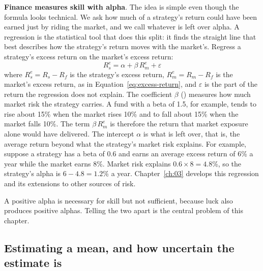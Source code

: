 \textbf{Finance measures skill with alpha}. The idea is simple even though the formula looks technical. We ask how much of a strategy's return could have been earned just by riding the market, and we call whatever is left over alpha. A regression is the statistical tool that does this split: it finds the straight line that best describes how the strategy's return moves with the market's. Regress a strategy's excess return on the market's excess return:
\begin{equation}
  R^{e}_{s} = \alpha + \beta\, R^{e}_{m} + \varepsilon \nonumber
\label{eq:ch01_beta}
\end{equation}
where $R^{e}_{s} = R_s - R_f$ is the strategy's excess return, $R^{e}_{m} = R_m - R_f$ is the market's excess return, as in Equation~\eqref{eq:excess-return}, and $\varepsilon$ is the part of the return the regression does not explain. The coefficient $\beta$ () measures how much market risk the strategy carries. A fund with a beta of 1.5, for example, tends to rise about 15\% when the market rises 10\% and to fall about 15\% when the market falls 10\%. The term $\beta\, R^{e}_{m}$ is therefore the return that market exposure alone would have delivered. The intercept $\alpha$ is what is left over, that is, the average return beyond what the strategy's market risk explains. For example, suppose a strategy has a beta of 0.6 and earns an average excess return of 6\% a year while the market earns 8\%. Market risk explains $0.6 \times 8 = 4.8$\%, so the strategy's alpha is $6 - 4.8 = 1.2$\% a year. Chapter~\ref{ch:03} develops this regression and its extensions to other sources of risk.

A positive alpha is necessary for skill but not sufficient, because luck also produces positive alphas. Telling the two apart is the central problem of this chapter.

\subsection{Estimating a mean, and how uncertain the estimate is}
\label{sec:01-se}

